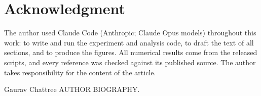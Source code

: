 \documentclass{ieeeaccess}
\begin{document}
\section*{Acknowledgment}
The author used Claude Code (Anthropic; Claude Opus models) throughout this work: to write and run the experiment and
analysis code, to draft the text of all sections, and to produce the figures. All numerical results come from the
released scripts, and every reference was checked against its published source. The author takes responsibility for the
content of the article.




\begin{IEEEbiographynophoto}{Gaurav Chattree}
AUTHOR BIOGRAPHY.
\end{IEEEbiographynophoto}

\EOD
\end{document}

